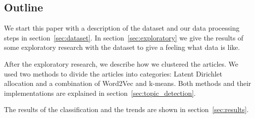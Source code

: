 \subsection{Outline}
We start this paper with a description of the dataset and our data processing steps in section~\ref{sec:dataset}. In section~\ref{sec:exploratory} we give the results of some exploratory research with the dataset to give a feeling what data is like.

After the exploratory research, we describe how we clustered the articles. We used two methods to divide the articles into categories: Latent Dirichlet allocation and a combination of Word2Vec and k-means. Both methods and their implementations are explained in section~\ref{sec:topic_detection}. 

The results of the classification and the trends are shown in section~\ref{sec:results}.